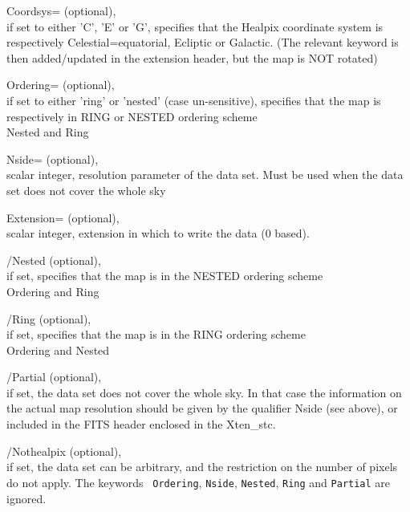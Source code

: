 \begin{keywords}
  \begin{kwlist}{} %
       \item[{Coordsys=}]  
		  (optional), \\
		if set to either 'C', 'E' or 'G',  specifies that the
		Healpix coordinate system is respectively Celestial=equatorial,
		  Ecliptic or Galactic.
		(The relevant keyword is then added/updated in the extension
		  header, but the map is NOT rotated)

	\item[{Ordering=}]  
		  (optional), \\
		if set to either 'ring' or 'nested' (case un-sensitive),
		  specifies that the map is respectively in RING or NESTED
		  ordering scheme\\
		\seealso Nested and Ring

	\item[{Nside=}]   
		(optional), \\
		scalar integer, \healpix resolution parameter of the
		data set. Must be used when the data set does not
		cover the whole sky

	\item[{Extension=}]  
		(optional), \\
		scalar integer, extension in which to write the data
		(0 based).\\

	\item[{/Nested}]   
	  (optional), \\ 
	  if set, specifies that the map is in the NESTED ordering
	scheme\\
	\seealso Ordering and Ring 

	\item[{/Ring}]   
	  (optional), \\ 
	  if set, specifies that the map is in the RING ordering
	scheme\\
	\seealso Ordering and Nested

	\item[{/Partial}]   
	  (optional), \\ 
	  if set, the data set does not cover the whole sky. In
	that case the information on the actual map resolution should be given by the
	qualifier Nside (see above), or included in the FITS header enclosed in
	the Xten\_stc.

	\item[{/Nothealpix}]   
	  (optional), \\ 
	  if set, the data set can be arbitrary, and the
	restriction on the number of pixels do not apply. The keywords {\tt
	Ordering}, {\tt Nside}, {\tt Nested}, {\tt Ring} and {\tt Partial} are ignored.

   \end{kwlist}
\end{keywords}

